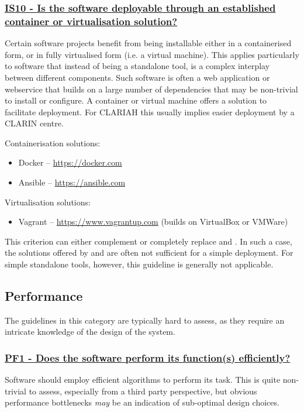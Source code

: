 \documentclass[a4paper,11pt]{article}
\newcommand{\criterion}[2]{\subsubsection*{\underline{#1 - #2}}\label{id:#1}}
\newcommand\CheckTable{%
  \begin{tabular}{ccccc}
    No & Minimal & Adequate & Good & Perfect \\
    0 & 1 & 2 & 3 & 4 \\
    \hline
    $\square$ & $\square$ & $\square$ & $\square$ & $\square$ \\
  \end{tabular}%
}
\newcommand{\refcrit}[1]{%
 \framebox[1.1\width]{\hyperref[id:#1]{#1}}
}
\begin{document}
\newcommand{\isTenID}{IS10}
\newcommand{\isTenText}{Is the software deployable through an established container or virtualisation solution?}
\criterion{\isTenID}{\isTenText}

Certain software projects benefit from being installable either in a
containerised form, or in fully virtualised form (i.e. a virtual machine). This
applies particularly to software that instead of being a standalone tool, is a
complex interplay between different components. Such software is often a web
application or webservice that builds on a large number of dependencies that
may be non-trivial to install or configure. A container or virtual machine
offers a solution to facilitate deployment. For CLARIAH this usually implies
easier deployment by a CLARIN centre.

Containerisation solutions:

\begin{itemize}
    \item Docker -- \url{https://docker.com}
    \item Ansible -- \url{https://ansible.com}
\end{itemize}

Virtualisation solutions:

\begin{itemize}
    \item Vagrant -- \url{https://www.vagrantup.com} (builds on VirtualBox or VMWare)
\end{itemize}

This criterion can either complement or completely replace \refcrit{IS3} and
\refcrit{IS4}. In such a case, the solutions offered by \refcrit{IS3} and
\refcrit{IS4} are often not sufficient for a simple deployment. For simple
standalone tools, however, this guideline is generally not applicable.


\subsection{Performance}\label{sec:per}

The guidelines in this category are typically hard to assess, as they require
an intricate knowledge of the design of the system. 

\newcommand{\pfOneID}{PF1}
\newcommand{\pfOneText}{Does the software perform its function(s) efficiently?}
\criterion{\pfOneID}{\pfOneText}

Software should employ efficient algorithms to perform its task. This is quite
non-trivial to assess, especially from a third party perspective, but obvious
performance bottlenecks \emph{may} be an indication of sub-optimal design
choices.
\end{document}

